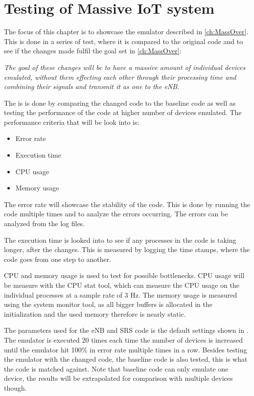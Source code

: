 \chapter{Testing of Massive IoT system} \label{ch:mass_test}
The focus of this chapter is to showcase the emulator described in \autoref{ch:MassOver}. This is done in a series of test, where it is compared to the original code and to see if the changes made fulfil the goal set in \autoref{ch:MassOver}:

\textit{The goal of these changes will be to have a massive amount of individual devices emulated, without them effecting each other through their processing time and combining their signals and transmit it as one to the eNB.}

The is is done by comparing the changed code to the baseline code as well as testing the performance of the code at higher number of devices emulated.
The performance criteria that will be look into is:

\begin{itemize}
\item Error rate
\item Execution time
\item CPU usage
\item Memory usage
\end{itemize}

The error rate will showcase the stability of the code. This is done by running the code multiple times and to analyze the errors occurring. The errors can be analyzed from the log files.

The execution time is looked into to see if any processes in the code is taking longer, after the changes. This is measured by logging the time stamps, where the code goes from one step to another. 

CPU and memory usage is used to test for possible bottlenecks. CPU usage will be measure with the CPU stat tool, which can measure the CPU usage on the individual processes at a sample rate of 3 Hz. The memory usage is measured using the system monitor tool, as all bigger buffers is allocated in the initialization and the used memory therefore is nearly static. 

The parameters used for the eNB and SRS code is the default settings shown in . The emulator is executed 20 times each time the number of devices is increased until the emulator hit 100\% in error rate multiple times in a row. Besides testing the emulator with the changed code, the baseline code is also tested, this is what the code is matched against. Note that baseline code can only emulate one device, the results will be extrapolated for comparison with multiple devices though.

